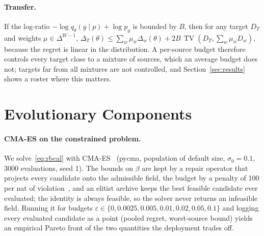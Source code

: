 \documentclass[runningheads]{llncs}
\newcommand{\TV}{\operatorname{TV}}
\begin{document}
\paragraph{Transfer.}
If the log-ratio $-\log q_\theta(y\mid p)+\log p_y$ is bounded by $B$, then for any target $D_T$ and weights $\mu\in\Delta^{W-1}$, $\Delta_T(\theta)\le\sum_w\mu_w\Delta_w(\theta)+2B\,\TV(D_T,\sum_w\mu_wD_w)$, because the regret is linear in the distribution.
A per-source budget therefore controls every target close to a mixture of sources, which an average budget does not; targets far from all mixtures are not controlled, and Section~\ref{sec:results} shows a roster where this matters.

\section{Evolutionary Components}\label{sec:evo}
\paragraph{CMA-ES on the constrained problem.}
We solve~\eqref{eq:rbcal} with CMA-ES~\cite{hansen2001cma} (pycma, population of default size, $\sigma_0=0.1$, 3000 evaluations, seed 1).
The bounds on $\beta$ are kept by a repair operator that projects every candidate onto the admissible field, the budget by a penalty of 100 per nat of violation~\cite{coello2002constraint}, and an elitist archive keeps the best feasible candidate ever evaluated; the identity is always feasible, so the solver never returns an infeasible field.
Running it for budgets $\varepsilon\in\{0,0.0025,0.005,0.01,0.02,0.05,0.1\}$ and logging every evaluated candidate as a point (pooled regret, worst-source bound) yields an empirical Pareto front of the two quantities the deployment trades off.
\end{document}
